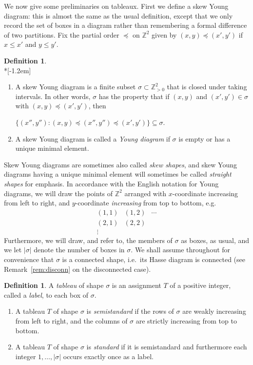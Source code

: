 \documentclass[11pt]{article}
\theoremstyle{definition}
\newtheorem{defi}[theorem]{Definition}
\newcommand{\eg}{e.g.\ }
\newcommand{\ie}{i.e.\ }
\newcommand{\ZZ}{\mathbb{Z}}
\begin{document}
We now give some preliminaries on tableaux. First we define a skew Young diagram: this is almost the same as the usual definition, except that we only record the set of boxes in a diagram rather than remembering a formal difference of two partitions.
Fix the partial order $\preceq$ on $\ZZ^2$ given by $(x,y)\preceq (x',y')$ if $x\le x'$ and $y\le y'$. 

\begin{defi}\label{def:young}\ \\*[-1.2em]
\begin{enumerate}
\item\label{defi2.1_1} 
A skew Young diagram is a finite subset $\sigma \subset \ZZ_{>0}^2$ that is closed under taking intervals. In other words, $\sigma$ has the property that if $(x,y)$ and $(x',y')\in \sigma$ with $(x,y)\preceq (x',y')$, then 
\begin{center}
$\{(x'',y''):(x,y)\preceq (x'',y'') \preceq (x',y')\}\subseteq \sigma.$
\end{center}
\item\label{defi2.1_2} A skew Young diagram is called a \emph{Young diagram} if $\sigma$ is empty or has a unique minimal element.
\end{enumerate}
\end{defi}

Skew Young diagrams are sometimes also called \emph{skew shapes}, and skew Young diagrams having a unique minimal element will sometimes be called \emph{straight shapes} for emphasis. 
In accordance with the English notation for Young diagrams, we will draw the points of $\ZZ^2$ arranged with $x$-coordinate increasing from left to right, and $y$-coordinate \emph{increasing} from top to bottom, \eg
\[
\begin{array}{ccc}
(1,1) & (1,2) & \cdots \\
(2,1) & (2,2) & \\
\vdots & &
\end{array}
\]
Furthermore, we will draw, and refer to, the members of $\sigma$ as boxes, as usual, and we let $|\sigma|$ denote the number of boxes in $\sigma$. We shall assume throughout for convenience that $\sigma$ is a connected shape, \ie its Hasse diagram is connected (see Remark~\ref{rem:disconn} on the disconnected case). 

\begin{defi} \label{def:tableau}
A \emph{tableau} of shape $\sigma$ is an assignment $T$ of a positive integer, called a \emph{label}, to each box of $\sigma$. \begin{enumerate}
\item\label{defi2.2_1} A tableau $T$ of shape $\sigma$ is \emph{semistandard} if the rows of $\sigma$ are weakly increasing from left to right, and the columns of $\sigma$ are strictly increasing from top to bottom.
\item\label{defi2.2_2} A tableau $T$ of shape $\sigma$ is \emph{standard} if it is semistandard and furthermore each integer $1,\ldots,|\sigma|$ occurs exactly once as a label.
\end{enumerate}

\end{defi}
\end{document}
